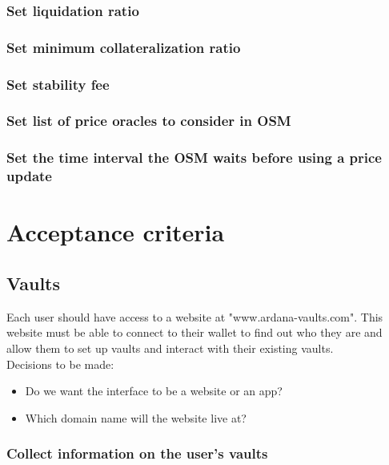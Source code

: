 \documentclass{article} %
\begin{document}
\subsubsection{Set liquidation ratio}

\subsubsection{Set minimum collateralization ratio}

\subsubsection{Set stability fee}

\subsubsection{Set list of price oracles to consider in OSM}

\subsubsection{Set the time interval the OSM waits before using a price update}

\section{Acceptance criteria}

\subsection{Vaults}

Each user should have access to a website at "www.ardana-vaults.com". This
website must be able to connect to their wallet to find out who they are and
allow them to set up vaults and interact with their existing vaults. \\

Decisions to be made:
\begin{itemize}
  \item Do we want the interface to be a website or an app?
  \item Which domain name will the website live at?
\end{itemize}

\subsubsection{Collect information on the user's vaults}
\end{document}
